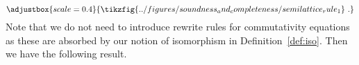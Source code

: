 \[
\adjustbox{scale=0.4}{
	\tikzfig{../figures/soundness_and_completeness/semilattice_rule_1}~.
}
\]
Note that we do not need to introduce rewrite rules for commutativity equations as these are absorbed by our notion of isomorphism in Definition~\ref{def:iso}.
Then we have the following result. 



